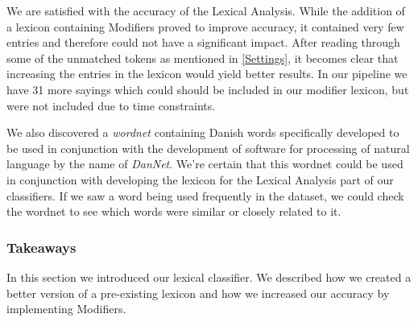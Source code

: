We are satisfied with the accuracy of the Lexical Analysis. While the addition of a lexicon containing Modifiers proved to improve accuracy, it contained very few entries and therefore could not have a significant impact. After reading through some of the unmatched tokens as mentioned in \ref{Settings}\label{settings}, it becomes clear that increasing the entries in the lexicon would yield better results. In our pipeline we have 31 more sayings which could should be included in our modifier lexicon, but were not included due to time constraints. 

We also discovered a \textit{wordnet} containing Danish words specifically developed to be used in conjunction with the development of software for processing of natural language by the name of \textit{DanNet}.\cite{dannet} We're certain that this wordnet could be used in conjunction with developing the lexicon for the Lexical Analysis part of our classifiers. If we saw a word being used frequently in the dataset, we could check the wordnet to see which words were similar or closely related to it. 

\subsubsection{Takeaways}
In this section we introduced our lexical classifier. We described how we created a better version of a pre-existing lexicon and how we increased our accuracy by implementing Modifiers.
